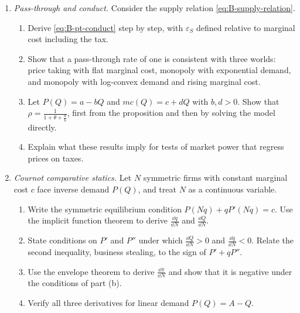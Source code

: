 \begin{enumerate}[label=\arabic*., leftmargin=*, itemsep=6pt]
\item \emph{Pass-through and conduct.} Consider the supply relation \eqref{eq:B-supply-relation}.
\begin{enumerate}[label=(\alph*)]
  \item Derive \eqref{eq:B-pt-conduct} step by step, with $\varepsilon_S$ defined relative to marginal cost including
  the tax.
  \item Show that a pass-through rate of one is consistent with three worlds: price taking with flat marginal cost,
  monopoly with exponential demand, and monopoly with log-convex demand and rising marginal cost.
  \item Let $P(Q) = a - bQ$ and $mc(Q) = c + dQ$ with $b, d > 0$. Show that $\rho = \frac{1}{1 + \theta + \frac{d}{b}}$,
  first from the proposition and then by solving the model directly.
  \item Explain what these results imply for tests of market power that regress prices on taxes.
\end{enumerate}

\item \emph{Cournot comparative statics.} Let $N$ symmetric firms with constant marginal cost $c$ face inverse demand
$P(Q)$, and treat $N$ as a continuous variable.
\begin{enumerate}[label=(\alph*)]
  \item Write the symmetric equilibrium condition $P(Nq) + qP'(Nq) = c$. Use the implicit function theorem to derive
  $\frac{\dd q}{\dd N}$ and $\frac{\dd Q}{\dd N}$.
  \item State conditions on $P'$ and $P''$ under which $\frac{\dd Q}{\dd N} > 0$ and $\frac{\dd q}{\dd N} < 0$. Relate
  the second inequality, business stealing, to the sign of $P' + qP''$.
  \item Use the envelope theorem to derive $\frac{\dd \pi}{\dd N}$ and show that it is negative under the conditions
  of part (b).
  \item Verify all three derivatives for linear demand $P(Q) = A - Q$.
\end{enumerate}


\end{enumerate}
